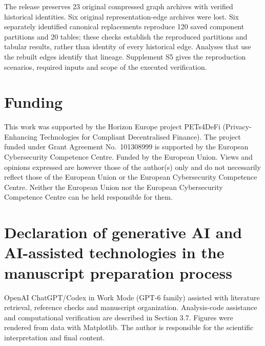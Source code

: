 \documentclass[preprint,12pt]{elsarticle}
\begin{document}
The release preserves 23 original compressed graph archives with verified historical identities. Six original representation-edge archives were lost. Six separately identified canonical replacements reproduce 120 saved component partitions and 20 tables; these checks establish the reproduced partitions and tabular results, rather than identity of every historical edge. Analyses that use the rebuilt edges identify that lineage. Supplement S5 gives the reproduction scenarios, required inputs and scope of the executed verification.

\section*{Funding}\label{funding}

This work was supported by the Horizon Europe project PETs4DeFi (Privacy-Enhancing Technologies for Compliant Decentralised Finance). The project funded under Grant Agreement No.~101308999 is supported by the European Cybersecurity Competence Centre. Funded by the European Union. Views and opinions expressed are however those of the author(s) only and do not necessarily reflect those of the European Union or the European Cybersecurity Competence Centre. Neither the European Union nor the European Cybersecurity Competence Centre can be held responsible for them.

\section*{Declaration of generative AI and AI-assisted technologies in the manuscript preparation process}\label{declaration-of-generative-ai-and-ai-assisted-technologies-in-the-manuscript-preparation-process}

OpenAI ChatGPT/Codex in Work Mode (GPT-6 family) assisted with literature retrieval, reference checks and manuscript organization. Analysis-code assistance and computational verification are described in Section 3.7. Figures were rendered from data with Matplotlib. The author is responsible for the scientific interpretation and final content.
\FloatBarrier


\end{document}
